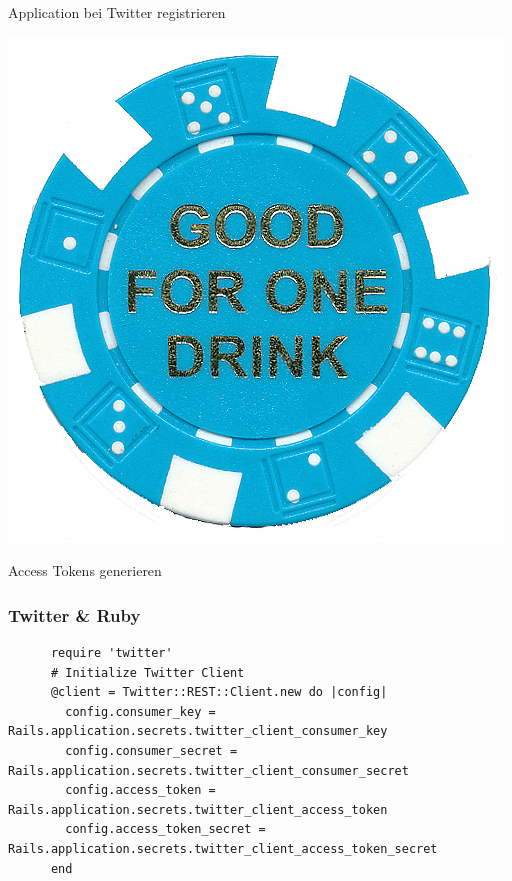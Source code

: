 \documentclass{beamer}
\begin{document}
\begin{frame}
\begin{minipage}{.2\textwidth}
  \end{minipage}%
  \hfill
  \begin{minipage}{.8\textwidth}
    Application bei Twitter registrieren \pause \\    
  \end{minipage}
  \begin{minipage}{.2\textwidth}
    \includegraphics[height=.2\textheight]{token}
  \end{minipage}%
  \hfill
  \begin{minipage}{.8\textwidth}
    Access Tokens generieren    
  \end{minipage}
\end{frame}

\begin{frame}[fragile]
  \frametitle{Twitter \& Ruby}
    \begin{lstlisting}
      require 'twitter'
      # Initialize Twitter Client
      @client = Twitter::REST::Client.new do |config|
        config.consumer_key = Rails.application.secrets.twitter_client_consumer_key
        config.consumer_secret = Rails.application.secrets.twitter_client_consumer_secret
        config.access_token = Rails.application.secrets.twitter_client_access_token
        config.access_token_secret = Rails.application.secrets.twitter_client_access_token_secret
      end
    \end{lstlisting}    
\end{frame}
\end{document}
